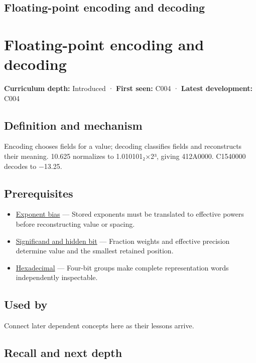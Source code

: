\hypertarget{appendix-6854d0e2218e}{}
\section*{Floating-point encoding and decoding}
\chapter{Floating-point encoding and decoding}\label{appendix-6854d0e2218e-floating-point-encoding-and-decoding}

\textbf{Curriculum depth:} Introduced · \textbf{First seen:} C004 · \textbf{Latest development:} C004

\section{Definition and mechanism}\label{appendix-6854d0e2218e-definition-and-mechanism}

Encoding chooses fields for a value; decoding classifies fields and reconstructs their meaning. 10.625 normalizes to 1.010101₂×2³, giving 412A0000. C1540000 decodes to −13.25.

\section{Prerequisites}\label{appendix-6854d0e2218e-prerequisites}

\begin{itemize}
\tightlist
\item
  \hyperref[appendix-2fae058c82e1]{Exponent bias} --- Stored exponents must be translated to effective powers before reconstructing value or spacing.
\item
  \hyperref[appendix-a24fd710cf67]{Significand and hidden bit} --- Fraction weights and effective precision determine value and the smallest retained position.
\item
  \hyperref[appendix-6b8075763724]{Hexadecimal} --- Four-bit groups make complete representation words independently inspectable.
\end{itemize}

\section{Used by}\label{appendix-6854d0e2218e-used-by}

Connect later dependent concepts here as their lessons arrive.

\section{Recall and next depth}\label{appendix-6854d0e2218e-recall-and-next-depth}

